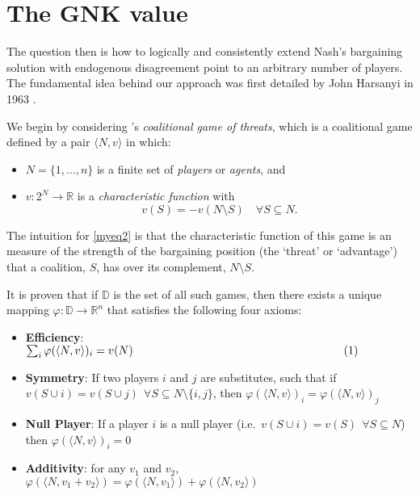 \documentclass[
10pt, %
a4paper, %
oneside, %
headinclude,footinclude, %
BCOR5mm, %
]{scrartcl}
\begin{document}
\section{The GNK value}


The question then is how to logically and consistently extend Nash's bargaining solution with endogenous disagreement point to an arbitrary number of players.
The fundamental idea behind our approach was first detailed by John Harsanyi in 1963 \cite{values3}.


We begin by considering \cite{KOHLBERG2018139}'s \textit{coalitional game of threats}, 
which is a coalitional game defined by a pair $\langle N,v \rangle$ in which:
\begin{itemize}
\item	$N=\{1,\dots,n\}$ is a finite set of \textit{players} or \textit{agents}, and
\item	$v:2^N\rightarrow \mathbb{R}$ is a \textit{characteristic function} with 
\begin{equation}
v(S)=-v(N\setminus S) \label{myeq2} \quad \forall S\subseteq N.
\end{equation}
\end{itemize}
The intuition for \eqref{myeq2} is that the characteristic function of this game is an measure of the strength of the bargaining position (the `threat' or `advantage') that a coalition, $S$, has over its complement, $N\setminus S$.

It is proven that if $\mathbb{D}$ is the set of all such games, then there exists a unique mapping $\varphi:\mathbb{D}\rightarrow\mathbb{R}^n$ that satisfies the following four axioms:

\begin{itemize}
\item	\textbf{Efficiency}: $\sum_i\varphi(\langle N,v\rangle)_i = v(N)\qquad\qquad\qquad\qquad\qquad\qquad\qquad\qquad\qquad~~\refstepcounter{equation}(\theequation)\label{myeq}$
\item	\textbf{Symmetry}: If two players $i$ and $j$ are substitutes, such that if $v(S\cup i)=v(S\cup j)~~\forall S\subseteq N\setminus\{i,j\}$, then $\varphi(\langle N,v\rangle)_i = \varphi(\langle N,v\rangle)_j$
\item	\textbf{Null Player}: If a player $i$ is a null player (i.e.\ $v(S\cup i)=v(S)~~\forall S\subseteq N$) then $\varphi(\langle N,v\rangle)_i=0$
\item	\textbf{Additivity}: for any $v_1$ and $v_2$, $\varphi(\langle N,v_1+v_2\rangle)=\varphi(\langle N,v_1 \rangle) + \varphi(\langle N,v_2\rangle)$
\end{itemize}
\end{document}
